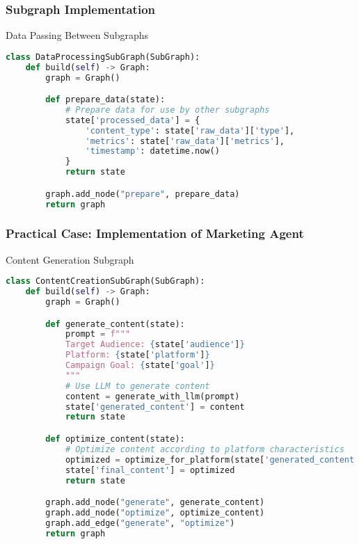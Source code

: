 \begin{frame}[fragile]\frametitle{Subgraph Implementation}

Data Passing Between Subgraphs

\begin{lstlisting}[language=Python, basicstyle=\tiny]
class DataProcessingSubGraph(SubGraph):
    def build(self) -> Graph:
        graph = Graph()

        def prepare_data(state):
            # Prepare data for use by other subgraphs
            state['processed_data'] = {
                'content_type': state['raw_data']['type'],
                'metrics': state['raw_data']['metrics'],
                'timestamp': datetime.now()
            }
            return state

        graph.add_node("prepare", prepare_data)
        return graph
\end{lstlisting}
\end{frame}

\begin{frame}[fragile]\frametitle{Practical Case: Implementation of Marketing Agent}

Content Generation Subgraph

\begin{lstlisting}[language=Python, basicstyle=\tiny]
class ContentCreationSubGraph(SubGraph):
    def build(self) -> Graph:
        graph = Graph()

        def generate_content(state):
            prompt = f"""
            Target Audience: {state['audience']}
            Platform: {state['platform']}
            Campaign Goal: {state['goal']}
            """
            # Use LLM to generate content
            content = generate_with_llm(prompt)
            state['generated_content'] = content
            return state

        def optimize_content(state):
            # Optimize content according to platform characteristics
            optimized = optimize_for_platform(state['generated_content'], state['platform'])
            state['final_content'] = optimized
            return state

        graph.add_node("generate", generate_content)
        graph.add_node("optimize", optimize_content)
        graph.add_edge("generate", "optimize")
        return graph
\end{lstlisting}
\end{frame}

